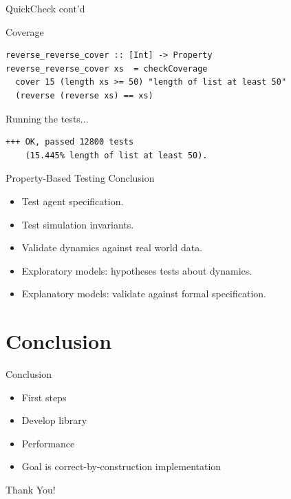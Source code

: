 \documentclass{beamer} %
\begin{document}
\begin{frame}[fragile]{QuickCheck cont'd}
\begin{block}{Coverage}
\begin{verbatim}
reverse_reverse_cover :: [Int] -> Property
reverse_reverse_cover xs  = checkCoverage 
  cover 15 (length xs >= 50) "length of list at least 50"
  (reverse (reverse xs) == xs)
\end{verbatim}
\end{block}

\begin{block}{Running the tests...}
\begin{footnotesize}
\begin{verbatim}
+++ OK, passed 12800 tests 
    (15.445% length of list at least 50).
\end{verbatim}
\end{footnotesize}
\end{block}
\end{frame}

\begin{frame}{Property-Based Testing Conclusion}
  \begin{itemize}
    \item Test agent specification.
    \item Test simulation invariants.
    \item Validate dynamics against real world data.
    \item Exploratory models: hypotheses tests about dynamics.
    \item Explanatory models: validate against formal specification.
  \end{itemize}
\end{frame}

\section{Conclusion}
\begin{frame}{Conclusion}
  \begin{itemize}
  	\item First steps
  	\item Develop library
  	\item Performance
    \item Goal is correct-by-construction implementation %
  \end{itemize}
\end{frame}

\begin{frame}{}
  \begin{center}
  Thank You!
  \end{center}
\end{frame}
\end{document}
